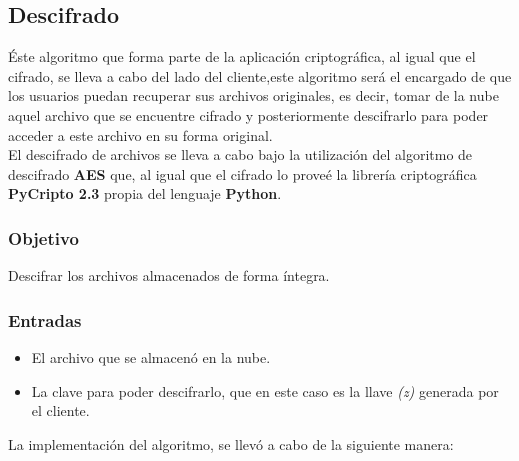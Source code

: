 \subsection{Descifrado}
Éste algoritmo que forma parte de la aplicación criptográfica, al igual que el cifrado, se lleva a cabo del lado del cliente,este algoritmo será el encargado de que los usuarios puedan recuperar sus archivos originales, es decir, tomar de la nube aquel archivo que se encuentre cifrado y posteriormente descifrarlo para poder acceder a este archivo en su forma original. \\
El descifrado de archivos se lleva a cabo bajo la utilización del algoritmo de descifrado \textbf{AES} que, al igual que el cifrado lo proveé la librería criptográfica \textbf{PyCripto 2.3} propia del lenguaje \textbf{Python}.\\ 

\subsubsection{Objetivo}
Descifrar los archivos almacenados de forma íntegra.

\subsubsection{Entradas}
	\begin{itemize}
		\item El archivo que se almacenó en la nube.
		\item La clave para poder descifrarlo, que en este caso es la llave \textit{(z)} generada por el cliente.
	\end{itemize}

La implementación del algoritmo, se llevó a cabo de la siguiente manera: 

